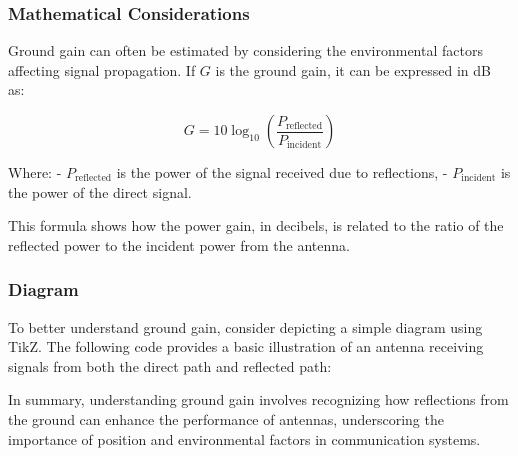 \subsubsection{Mathematical Considerations}

Ground gain can often be estimated by considering the environmental factors affecting signal propagation. If \( G \) is the ground gain, it can be expressed in dB as:

\[
G = 10 \log_{10}\left(\frac{P_{\text{reflected}}}{P_{\text{incident}}}\right)
\]

Where:
- \( P_{\text{reflected}} \) is the power of the signal received due to reflections,
- \( P_{\text{incident}} \) is the power of the direct signal.

This formula shows how the power gain, in decibels, is related to the ratio of the reflected power to the incident power from the antenna.

\subsubsection{Diagram}

To better understand ground gain, consider depicting a simple diagram using TikZ. The following code provides a basic illustration of an antenna receiving signals from both the direct path and reflected path:

\begin{center}
\end{center}

In summary, understanding ground gain involves recognizing how reflections from the ground can enhance the performance of antennas, underscoring the importance of position and environmental factors in communication systems.

